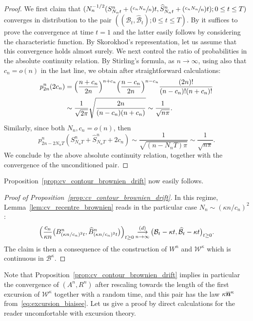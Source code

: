 \documentclass[10pt]{amsart}
\newcommand{\Psfrac}[2]{(\sfrac{#1}{#2})}
\newcommand{\bmn}{\protect\boldsymbol{n}}
\theoremstyle{plain}
\theoremstyle{definition}
\theoremstyle{remark}
\newcommand{\cvloi}[1][n]{\,\mathop{\longrightarrow}^{(d)}_{#1 \to \infty}\,}
\begin{document}
\begin{proof}
We first claim that $(N_{n}^{-1/2} (S^{n}_{N_{n}t}+\Psfrac{c_{n} N_{n}}{n}t, \widehat{S}^{n}_{N_{n}t}+\Psfrac{c_{n} N_{n}}{n}t) ; 0 \le t \le T)$ converges in distribution to the pair $((\mathcal{B}_{t}, \widehat{\mathcal{B}}_{t}) ; 0 \le t \le T)$. By \eg \cite[Th.\,16.14]{Kal02} it suffices to prove the convergence at time $t=1$ and the latter easily follows by considering the characteristic function.
By Skorokhod's representation, let us assume that this convergence holds almost surely. We next control the ratio of probabilities in the absolute continuity relation.
By Stirling's formula, as $n\to\infty$, using also that $c_{n} = o(n)$ in the last line, we obtain after straightforward calculations:\vspace*{-3pt}
\begin{align*}
p^n_{2n}(2c_{n})
&= \Bigl(\frac{n+c_{n}}{2n}\Bigr)^{n+c_{n}} \Bigl(\frac{n-c_{n}}{2n}\Bigr)^{n-c_{n}} \frac{(2n)!}{(n-c_{n})! (n+c_{n})!}
\\
&\sim \frac{1}{\sqrt{2\pi}} \sqrt{\frac{2n}{(n-c_{n}) (n+c_{n})}} \sim \frac{1}{\sqrt{n\pi}}.
\end{align*}
Similarly, since both $N_{n}, c_{n} = o(n)$, then
\[
p^n_{2n-2N_{n}T}(S^{n}_{N_{n}T}+\widehat{S}^{n}_{N_{n}T}+2c_{n})
\sim \frac{1}{\sqrt{(n-N_{n}T)\pi}}
\sim \frac{1}{\sqrt{n\pi}}.
\]
We conclude by the above absolute continuity relation, together with the convergence of the unconditioned pair.
\end{proof}

Proposition~\ref{prop:cv_contour_brownien_drift} now easily follows.

\begin{proof}[Proof of Proposition~\ref{prop:cv_contour_brownien_drift}]
In this regime, Lemma~\ref{lem:cv_recentre_brownien} reads in the particular case $N_n \sim (\kappa n/c_{n})^2$:
\begin{equation}\label{eq:cv_brownien_drift}
\Bigl(\frac{c_{n}}{\kappa n} \bigl(B^{n}_{(\kappa n/c_{n})^2 t}, \widehat{B}^{n}_{(\kappa n/c_{n})^2 t}\bigr)\Bigl)_{t \ge 0}
\cvloi \bigl(\mathcal{B}_{t}-\kappa t, \widehat{\mathcal{B}}_{t}-\kappa t\bigr)_{t \ge 0}.
\end{equation}
The claim is then a consequence of the construction of $W^n$ and $\mathcal{W}^\kappa$ which is continuous in $\mathcal{B}^\kappa$.
\end{proof}

Note that Proposition~\ref{prop:cv_contour_brownien_drift} implies in particular the convergence of $(A^n, R^n)$ after rescaling towards the length of the first excursion of $\mathcal{W}^\kappa$ together with a random time, and this pair has the law $\kappa \overline{\bmn}^\kappa$ from~\eqref{eq:excursion_biaisee}. Let us give a proof by direct calculations for the reader uncomfortable with excursion theory.
\end{document}
